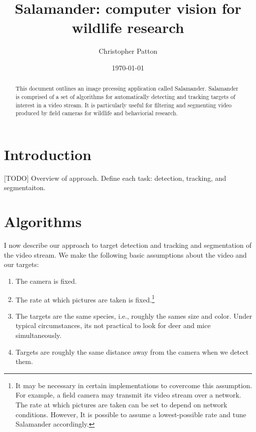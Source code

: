 \documentclass[letter]{article}
\author{Christopher Patton}
\date{\today}
\title{Salamander: computer vision for wildlife research}
\newcounter{foot}
\begin{document}
\maketitle

\begin{abstract}
This document outlines an image prcessing application called Salamander. Salamander
is comprised of a set of algorithms for automatically detecting and tracking 
targets of interest in a video stream. It is particularly useful for filtering 
and segmenting video produced by field cameras for wildlife and behaviorial 
research. 
\end{abstract}

\tableofcontents
\pagebreak 

\section{Introduction}
[TODO] Overview of approach. Define each task: detection, tracking, and segmentaiton. 

\section{Algorithms}
I now describe our approach to target detection and tracking and segmentation of 
the video stream. We make the following basic assumptions about the video and our
targets:  
\begin{enumerate}
  \item The camera is fixed. 
  
  \item The rate at which pictures are taken is fixed.\footnote{It may be necessary
   in certain implementations to covercome this assumption. For example, a field 
   camera may transmit its video stream over a network. The rate at which pictures 
   are taken can be set to depend on network conditions. However, It is possible to 
   assume a lowest-possible rate and tune Salamander accordingly.}

  \item The targets are the same species, i.e., roughly the sames size and color. 
   Under typical circumstances, its not practical to look for deer and mice 
   simultaneously.
  
  \item Targets are roughly the same distance away from the camera when we detect them. 
   
\end{enumerate}
\end{document}
